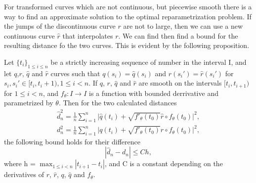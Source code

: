 For transformed curves which are not continuous, but piecewise smooth there is a way to find an approximate solution to the optimal reparametrization problem. If the jumps of the discontinuous curve \(r\) are not to large, then we can use a new continuous curve \(\hat r\) that interpolates \(r\). We can find then find a bound for the resulting distance fo the two curves. This is evident by the following proposition.
\begin{proposition}
  Let \(\{t_i\}_{1 \leq i\leq n}\) be a strictly increasing sequence of number in the interval I, and let \(q\),\(r\), \(\hat q\) and  \(\hat r\) curves such that \(q(s_i)=\hat q(s_i)\) and \(r(s_i')=\hat r(s_i')\) for \(s_i, s_i' \in [t_i, t_i+1), 1\leq i < n\). If  \(q\),  \(r\),   \(\hat q\) and  \(\hat r\) are smooth on the intervals  \([t_i, t_{i+1})\) for  \( 1 \leq i <n\), and  \(f_\theta : I \rightarrow I\) is a function with bounded derrivative and parametrized by \( \theta \). Then for the two calculated distances
  \begin{eqnarray}
    \hat d_n^2=\frac{1}{n}\sum_{i=1}^{n}\Big|\hat q(t_i) + \sqrt{f'_{\theta}(t_0)} \hat r \circ f_{\theta}(t_0)\Big|^2, \\
    d_n^2=\frac{1}{n}\sum_{i=1}^{n}\Big|q(t_i) + \sqrt{f'_{\theta}(t_0)} r \circ f_{\theta}(t_0)\Big|^2,
  \end{eqnarray}
  the following bound holds for their difference
  \begin{equation}
    | \hat d_n -d_n | \leq  C h,
  \end{equation}
  where h = \(\max_{1\leq i<n}|t_{i+1} - t_{i} |\), and C is a constant depending on the derivatives of  \(r\),  \(\hat{r}\),  \(q\),  \(\hat q\) and  \(f_{\theta}\).
\end{proposition}
